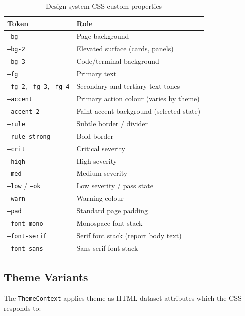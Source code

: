 \documentclass[11pt,a4paper,twoside,openright]{book}
\begin{document}
\begin{table}[H]
\centering
\begin{tabularx}{\textwidth}{L{3.5cm} X}
\toprule
\textbf{Token} & \textbf{Role} \\
\midrule
\texttt{--bg}                   & Page background \\
\texttt{--bg-2}                 & Elevated surface (cards, panels) \\
\texttt{--bg-3}                 & Code/terminal background \\
\texttt{--fg}                   & Primary text \\
\texttt{--fg-2}, \texttt{--fg-3}, \texttt{--fg-4} & Secondary and tertiary text tones \\
\texttt{--accent}               & Primary action colour (varies by theme) \\
\texttt{--accent-2}             & Faint accent background (selected state) \\
\texttt{--rule}                 & Subtle border / divider \\
\texttt{--rule-strong}          & Bold border \\
\texttt{--crit}                 & Critical severity \\
\texttt{--high}                 & High severity \\
\texttt{--med}                  & Medium severity \\
\texttt{--low} / \texttt{--ok} & Low severity / pass state \\
\texttt{--warn}                 & Warning colour \\
\texttt{--pad}                  & Standard page padding \\
\texttt{--font-mono}            & Monospace font stack \\
\texttt{--font-serif}           & Serif font stack (report body text) \\
\texttt{--font-sans}            & Sans-serif font stack \\
\bottomrule
\end{tabularx}
\caption{Design system CSS custom properties}
\end{table}

\subsection{Theme Variants}

The \texttt{ThemeContext} applies theme as HTML dataset attributes which the CSS responds to:
\end{document}
